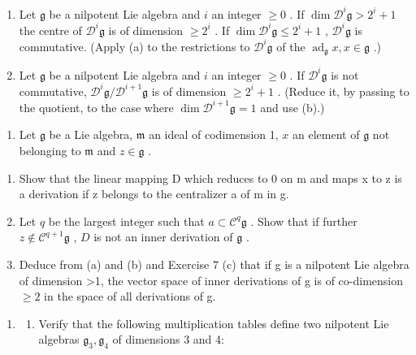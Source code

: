 \begin{enumerate}
\def\labelenumi{(\alph{enumi})}
\setcounter{enumi}{1}
\item
  Let \(\mathfrak{g}\) be a nilpotent Lie algebra and \(i\) an integer \(\geqslant 0\) . If \(\dim \mathcal{D}^{i}\mathfrak{g} > 2^{i} + 1\) the centre of \(\mathcal{D}^{i}\mathfrak{g}\) is of dimension \(\geqslant 2^{i}\) . If \(\dim \mathcal{D}^{i}\mathfrak{g} \leqslant 2^{i} + 1\) , \(\mathcal{D}^{i}\mathfrak{g}\) is commutative. (Apply (a) to the restrictions to \(\mathcal{D}^{i}\mathfrak{g}\) of the \(\operatorname{ad}_{\mathfrak{g}} x, x \in \mathfrak{g}\) .)
\item
  Let \(\mathfrak{g}\) be a nilpotent Lie algebra and \(i\) an integer \(\geqslant 0\) . If \(\mathcal{D}^{i}\mathfrak{g}\) is not commutative, \(\mathcal{D}^{i}\mathfrak{g}/\mathcal{D}^{i+1}\mathfrak{g}\) is of dimension \(\geqslant 2^{i} + 1\) . (Reduce it, by passing to the quotient, to the case where \(\dim \mathcal{D}^{i+1}\mathfrak{g} = 1\) and use (b).)
\end{enumerate}

\begin{enumerate}
\def\labelenumi{\arabic{enumi}.}
\setcounter{enumi}{7}
\tightlist
\item
  Let \(\mathfrak{g}\) be a Lie algebra, \(\mathfrak{m}\) an ideal of codimension 1, \(x\) an element of \(\mathfrak{g}\) not belonging to \(\mathfrak{m}\) and \(z \in \mathfrak{g}\) .
\end{enumerate}

\begin{enumerate}
\def\labelenumi{(\alph{enumi})}
\item
  Show that the linear mapping D which reduces to 0 on m and maps x to z is a derivation if z belongs to the centralizer a of m in g.
\item
  Let \(q\) be the largest integer such that \(a \subset \mathcal{C}^q\mathfrak{g}\) . Show that if further \(z \notin \mathcal{C}^{q+1}\mathfrak{g}\) , \(D\) is not an inner derivation of \(\mathfrak{g}\) .
\item
  Deduce from (a) and (b) and Exercise 7 (c) that if g is a nilpotent Lie algebra of dimension \textgreater1, the vector space of inner derivations of g is of co-dimension \(\geqslant2\) in the space of all derivations of g.
\end{enumerate}

\begin{enumerate}
\def\labelenumi{\arabic{enumi}.}
\setcounter{enumi}{8}
\tightlist
\item
  \begin{enumerate}
  \def\labelenumii{(\alph{enumii})}
  \tightlist
  \item
    Verify that the following multiplication tables define two nilpotent Lie algebras \(\mathfrak{g}_3, \mathfrak{g}_4\) of dimensions 3 and 4:
  \end{enumerate}
\end{enumerate}

